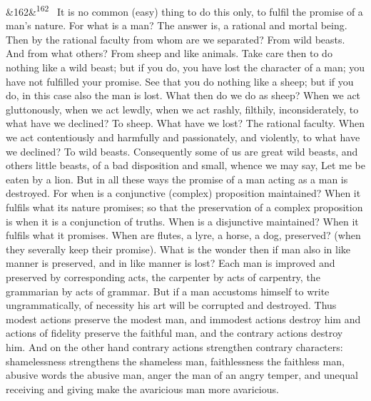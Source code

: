 \documentclass[12pt]{article}
\newcommand{\para}[1][]{\par\noindent\ifx&#1&\else\textsuperscript{\footnotesize #1}~\fi}
\begin{document}
\para[162] It is no common (easy) thing to do this only, to fulfil the promise of a man's nature. For what is a man? The answer is, a rational and mortal being. Then by the rational faculty from whom are we separated? From wild beasts. And from what others? From sheep and like animals. Take care then to do nothing like a wild beast; but if you do, you have lost the character of a man; you have not fulfilled your promise. See that you do nothing like a sheep; but if you do, in this case also the man is lost. What then do we do as sheep? When we act gluttonously, when we act lewdly, when we act rashly, filthily, inconsiderately, to what have we declined? To sheep. What have we lost? The rational faculty. When we act contentiously and harmfully and passionately, and violently, to what have we declined? To wild beasts. Consequently some of us are great wild beasts, and others little beasts, of a bad disposition and small, whence we may say, Let me be eaten by a lion. But in all these ways the promise of a man acting as a man is destroyed. For when is a conjunctive (complex) proposition maintained? When it fulfils what its nature promises; so that the preservation of a complex proposition is when it is a conjunction of truths. When is a disjunctive maintained? When it fulfils what it promises. When are flutes, a lyre, a horse, a dog, preserved? (when they severally keep their promise). What is the wonder then if man also in like manner is preserved, and in like manner is lost? Each man is improved and preserved by corresponding acts, the carpenter by acts of carpentry, the grammarian by acts of grammar. But if a man accustoms himself to write ungrammatically, of necessity his art will be corrupted and destroyed. Thus modest actions preserve the modest man, and immodest actions destroy him and actions of fidelity preserve the faithful man, and the contrary actions destroy him. And on the other hand contrary actions strengthen contrary characters: shamelessness strengthens the shameless man, faithlessness the faithless man, abusive words the abusive man, anger the man of an angry temper, and unequal receiving and giving make the avaricious man more avaricious.
\end{document}
